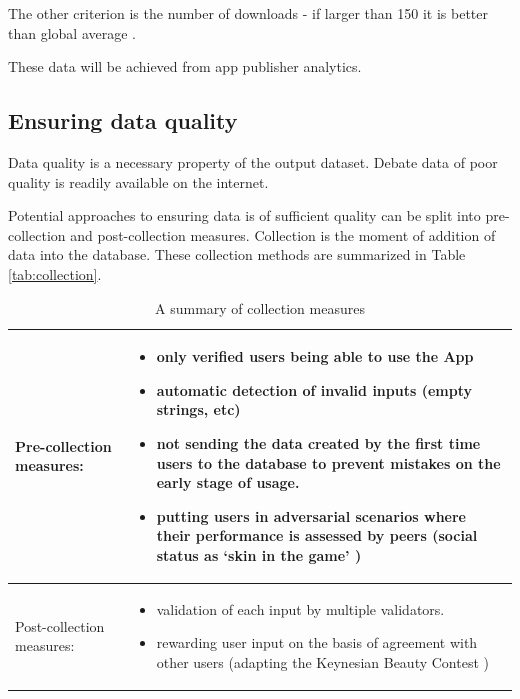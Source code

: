 \documentclass{report}
\begin{document}
{The other criterion is the number of downloads - if larger than 150 it is better than global average \cite{noauthor_average_nodate}.

These data will be achieved from app publisher analytics.

\subsection{Ensuring data quality}
Data quality is a necessary property of the output dataset. Debate data of poor quality is readily available on the internet.

Potential approaches to ensuring data is of sufficient quality can be split into pre-collection and post-collection measures. Collection is the moment of addition of data into the database. These collection methods are summarized in Table \ref{tab:collection}.

  \begin{table}[h!]
      \centering
    \begin{tabular}{|l|p{4cm}|}

\toprule
Pre-collection measures:  & \begin{itemize}[left=0pt,topsep=0pt]\item only verified users being able to use the App
  \item automatic detection of invalid inputs (empty strings, etc)
  \item not sending the data created by the first time users to the database to prevent mistakes on the early stage of usage.
  \item putting users in adversarial scenarios where their performance is assessed by peers (social status as `skin in the game' \cite{noauthor_have_2023})
\end{itemize} \\
\midrule

 Post-collection measures:  & \begin{itemize}[left=0pt,topsep=0pt]
  \item validation of each input by multiple validators.  
  \item rewarding user input on the basis of agreement with other users (adapting the Keynesian Beauty Contest \cite{keynes_general_1935})

\end{itemize} \\
\bottomrule
    \end{tabular}
    \caption{A summary of collection measures}


\end{table}}
\end{document}
